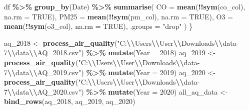 \documentclass[
]{article}
\newenvironment{Shaded}{\begin{snugshade}}{\end{snugshade}}
\newcommand{\AttributeTok}[1]{\textcolor[rgb]{0.13,0.29,0.53}{#1}}
\newcommand{\ConstantTok}[1]{\textcolor[rgb]{0.56,0.35,0.01}{#1}}
\newcommand{\DecValTok}[1]{\textcolor[rgb]{0.00,0.00,0.81}{#1}}
\newcommand{\FunctionTok}[1]{\textcolor[rgb]{0.13,0.29,0.53}{\textbf{#1}}}
\newcommand{\NormalTok}[1]{#1}
\newcommand{\OtherTok}[1]{\textcolor[rgb]{0.56,0.35,0.01}{#1}}
\newcommand{\SpecialCharTok}[1]{\textcolor[rgb]{0.81,0.36,0.00}{\textbf{#1}}}
\newcommand{\StringTok}[1]{\textcolor[rgb]{0.31,0.60,0.02}{#1}}
\begin{document}
\begin{Shaded}
\begin{Highlighting}[]
\NormalTok{  df }\SpecialCharTok{\%\textgreater{}\%}
    \FunctionTok{group\_by}\NormalTok{(Date) }\SpecialCharTok{\%\textgreater{}\%}
    \FunctionTok{summarise}\NormalTok{(}
      \AttributeTok{CO =} \FunctionTok{mean}\NormalTok{(}\SpecialCharTok{!!}\FunctionTok{sym}\NormalTok{(co\_col), }\AttributeTok{na.rm =} \ConstantTok{TRUE}\NormalTok{),}
      \AttributeTok{PM25 =} \FunctionTok{mean}\NormalTok{(}\SpecialCharTok{!!}\FunctionTok{sym}\NormalTok{(pm\_col), }\AttributeTok{na.rm =} \ConstantTok{TRUE}\NormalTok{),}
      \AttributeTok{O3 =} \FunctionTok{mean}\NormalTok{(}\SpecialCharTok{!!}\FunctionTok{sym}\NormalTok{(o3\_col), }\AttributeTok{na.rm =} \ConstantTok{TRUE}\NormalTok{),}
      \AttributeTok{.groups =} \StringTok{"drop"}
\NormalTok{    )}
\NormalTok{\}}

\NormalTok{aq\_2018 }\OtherTok{\textless{}{-}} \FunctionTok{process\_air\_quality}\NormalTok{(}\StringTok{"C:}\SpecialCharTok{\textbackslash{}\textbackslash{}}\StringTok{Users}\SpecialCharTok{\textbackslash{}\textbackslash{}}\StringTok{User}\SpecialCharTok{\textbackslash{}\textbackslash{}}\StringTok{Downloads}\SpecialCharTok{\textbackslash{}\textbackslash{}}\StringTok{data{-}7}\SpecialCharTok{\textbackslash{}\textbackslash{}}\StringTok{data}\SpecialCharTok{\textbackslash{}\textbackslash{}}\StringTok{AQ\_2018.csv"}\NormalTok{) }\SpecialCharTok{\%\textgreater{}\%} \FunctionTok{mutate}\NormalTok{(}\AttributeTok{Year =} \DecValTok{2018}\NormalTok{)}
\NormalTok{aq\_2019 }\OtherTok{\textless{}{-}} \FunctionTok{process\_air\_quality}\NormalTok{(}\StringTok{"C:}\SpecialCharTok{\textbackslash{}\textbackslash{}}\StringTok{Users}\SpecialCharTok{\textbackslash{}\textbackslash{}}\StringTok{User}\SpecialCharTok{\textbackslash{}\textbackslash{}}\StringTok{Downloads}\SpecialCharTok{\textbackslash{}\textbackslash{}}\StringTok{data{-}7}\SpecialCharTok{\textbackslash{}\textbackslash{}}\StringTok{data}\SpecialCharTok{\textbackslash{}\textbackslash{}}\StringTok{AQ\_2019.csv"}\NormalTok{) }\SpecialCharTok{\%\textgreater{}\%} \FunctionTok{mutate}\NormalTok{(}\AttributeTok{Year =} \DecValTok{2019}\NormalTok{)}
\NormalTok{aq\_2020 }\OtherTok{\textless{}{-}} \FunctionTok{process\_air\_quality}\NormalTok{(}\StringTok{"C:}\SpecialCharTok{\textbackslash{}\textbackslash{}}\StringTok{Users}\SpecialCharTok{\textbackslash{}\textbackslash{}}\StringTok{User}\SpecialCharTok{\textbackslash{}\textbackslash{}}\StringTok{Downloads}\SpecialCharTok{\textbackslash{}\textbackslash{}}\StringTok{data{-}7}\SpecialCharTok{\textbackslash{}\textbackslash{}}\StringTok{data}\SpecialCharTok{\textbackslash{}\textbackslash{}}\StringTok{AQ\_2020.csv"}\NormalTok{) }\SpecialCharTok{\%\textgreater{}\%} \FunctionTok{mutate}\NormalTok{(}\AttributeTok{Year =} \DecValTok{2020}\NormalTok{)}
\NormalTok{all\_aq\_data }\OtherTok{\textless{}{-}} \FunctionTok{bind\_rows}\NormalTok{(aq\_2018, aq\_2019, aq\_2020)}
\end{Highlighting}
\end{Shaded}
\end{document}
